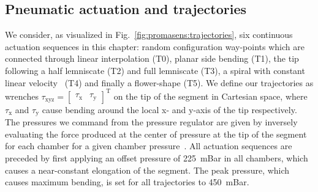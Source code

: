 \subsection{Pneumatic actuation and trajectories}
We consider, as visualized in Fig.~\ref{fig:promasens:trajectories}, six continuous actuation sequences in this chapter: random configuration way-points which are connected through linear interpolation (T0), planar side bending (T1), the tip following a half lemniscate (T2) and full lemniscate (T3), a spiral with constant linear velocity~\cite{carrasco2018constant} (T4) and finally a flower-shape (T5).
We define our trajectories as wrenches  $\tau_\mathrm{xyz} = \begin{bmatrix} \tau_\mathrm{x} & \tau_\mathrm{y} \end{bmatrix}^\mathrm{T}$ on the tip of the segment in Cartesian space, where $\tau_\mathrm{x}$ and $\tau_\mathrm{y}$ cause bending around the local x- and y-axis  of the tip respectively. %
The pressures we command from the pressure regulator are given by inversely evaluating the force produced at the center of pressure at the tip of the segment for each chamber for a given chamber pressure~\cite{della2019dynamic}.
All actuation sequences are preceded by first applying an offset pressure of \SI{225}{mBar} in all chambers, which causes a near-constant elongation of the segment. The peak pressure, which causes maximum bending, is set for all trajectories to \SI{450}{mBar}.


